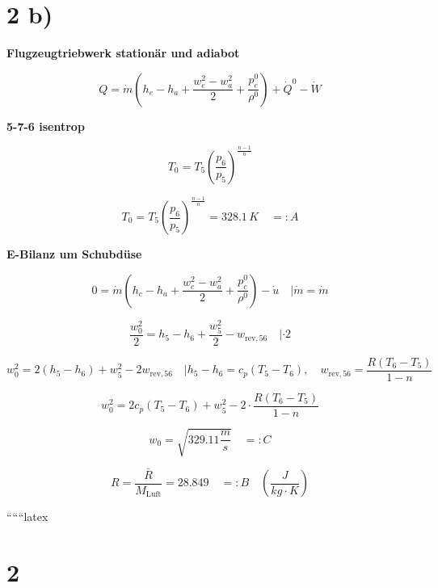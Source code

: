 \section*{2 b)}

\textbf{Flugzeugtriebwerk stationär und adiabot}

\[
Q = \dot{m} \left( h_e - h_a + \frac{w_e^2 - w_a^2}{2} + \frac{p_e^0}{\rho^0} \right) + \dot{Q}^0 - \dot{W}
\]

\textbf{5-7-6 isentrop}

\[
T_0 = T_5 \left( \frac{p_6}{p_5} \right)^{\frac{n-1}{n}}
\]

\[
T_0 = T_5 \left( \frac{p_6}{p_5} \right)^{\frac{n-1}{n}} = 328.1 \, K \quad =: A
\]

\textbf{E-Bilanz um Schubdüse}

\[
0 = \dot{m} \left( h_c - h_a + \frac{w_c^2 - w_a^2}{2} + \frac{p_c^0}{\rho^0} \right) - \dot{u} \quad | \dot{m} = \dot{m}
\]

\[
\frac{w_0^2}{2} = h_5 - h_6 + \frac{w_5^2}{2} - w_{\text{rev},56} \quad | \cdot 2
\]

\[
w_0^2 = 2 \left( h_5 - h_6 \right) + w_5^2 - 2 w_{\text{rev},56} \quad | h_5 - h_6 = c_p \left( T_5 - T_6 \right), \quad w_{\text{rev},56} = \frac{R \left( T_6 - T_5 \right)}{1 - n}
\]

\[
w_0^2 = 2 c_p \left( T_5 - T_6 \right) + w_5^2 - 2 \cdot \frac{R \left( T_6 - T_5 \right)}{1 - n}
\]

\[
w_0 = \sqrt{329.11 \frac{m}{s}} \quad =: C
\]

\[
R = \frac{\bar{R}}{M_{\text{Luft}}} = 28.849 \quad =: B \quad \left( \frac{J}{kg \cdot K} \right)
\]

``````latex


\section*{2}